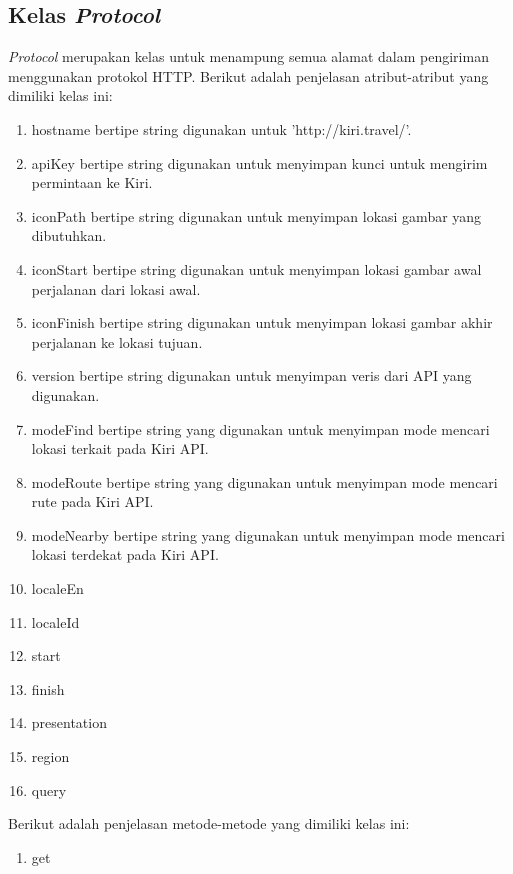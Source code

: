 \subsection{Kelas \textit{Protocol}}
\label{lab:Kelas Protocol}
\hspace{0.5cm} \textit{Protocol} merupakan kelas untuk menampung semua alamat dalam pengiriman menggunakan protokol HTTP. Berikut adalah penjelasan atribut-atribut yang dimiliki kelas ini:
\begin{enumerate}
	\item hostname bertipe string digunakan untuk 'http://kiri.travel/'.
	\item apiKey bertipe string digunakan untuk menyimpan kunci untuk mengirim permintaan ke Kiri.
	\item iconPath bertipe string digunakan untuk menyimpan lokasi gambar yang dibutuhkan.
	\item iconStart bertipe string digunakan untuk menyimpan lokasi gambar awal perjalanan dari lokasi awal.
	\item iconFinish bertipe string digunakan untuk menyimpan lokasi gambar akhir perjalanan ke lokasi tujuan.
	
	\item version bertipe string digunakan untuk menyimpan veris dari API yang digunakan.
	
	\item modeFind bertipe string yang digunakan untuk menyimpan mode mencari lokasi terkait pada Kiri API.
	\item modeRoute bertipe string yang digunakan untuk menyimpan mode mencari rute pada Kiri API.
	\item modeNearby bertipe string yang digunakan untuk menyimpan mode mencari lokasi terdekat pada Kiri API.
	
	\item localeEn
	\item localeId
	
	\item start
	\item finish
	
	\item presentation
	
	\item region 
	\item query
\end{enumerate}

Berikut adalah penjelasan metode-metode yang dimiliki kelas ini:
\begin{enumerate}
	\item get
\end{enumerate}


